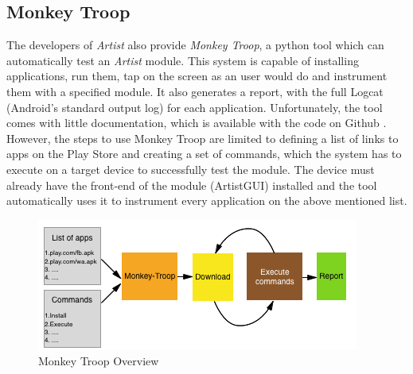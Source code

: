 \subsection{Monkey Troop}
The developers of \emph{Artist} also provide \emph{Monkey Troop}, a python tool which can automatically test an \emph{Artist} module. This system is capable of installing applications, run them, tap on the screen as an user would do and instrument them with a specified module. It also generates a report, with the full Logcat (Android's standard output log) for each application. Unfortunately, the tool comes with little documentation, which is available with the code on Github \cite{monkeytroop}. However, the steps to use Monkey Troop are limited to defining a list of links to apps on the Play Store and creating a set of commands, which the system has to execute on a target device to successfully test the module. The device must already have the front-end of the module (ArtistGUI) installed and the tool automatically uses it to instrument every application on the above mentioned list.

\begin{figure}[H]
	\centering
	\includegraphics{img/monkey_troop.png}
	\caption{Monkey Troop Overview}
	\label{fig:monkeyoverview}
\end{figure}

